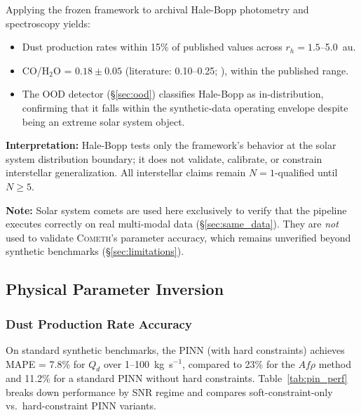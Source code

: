\documentclass[usenatbib]{mnras}
\begin{document}
Applying the frozen framework to archival Hale-Bopp photometry and spectroscopy \citep{bockelee04} yields:
\begin{itemize}
    \item Dust production rates within 15\% of published values across $r_h = 1.5$--5.0~au.
    \item CO/H$_2$O = $0.18 \pm 0.05$ (literature: 0.10--0.25; \citealt{bockelee04}), within the published range.
    \item The OOD detector (\S\ref{sec:ood}) classifies Hale-Bopp as in-distribution, confirming that it falls within the synthetic-data operating envelope despite being an extreme solar system object.
\end{itemize}

\textbf{Interpretation:} Hale-Bopp tests only the framework's behavior at the solar system distribution boundary; it does not validate, calibrate, or constrain interstellar generalization. All interstellar claims remain $N=1$-qualified until $N \geq 5$.

\noindent\textbf{Note:} Solar system comets are used here exclusively to verify that the pipeline executes correctly on real multi-modal data (\S\ref{sec:same_data}). They are \textit{not} used to validate \textsc{Cometh}'s parameter accuracy, which remains unverified beyond synthetic benchmarks (\S\ref{sec:limitations}).

\subsection{Physical Parameter Inversion}

\subsubsection{Dust Production Rate Accuracy}

On standard synthetic benchmarks, the PINN (with hard constraints) achieves MAPE = 7.8\% for $Q_d$ over 1--100~kg~s$^{-1}$, compared to 23\% for the $Af\rho$ method and 11.2\% for a standard PINN without hard constraints. Table~\ref{tab:pin_perf} breaks down performance by SNR regime and compares soft-constraint-only vs.\ hard-constraint PINN variants.
\end{document}
